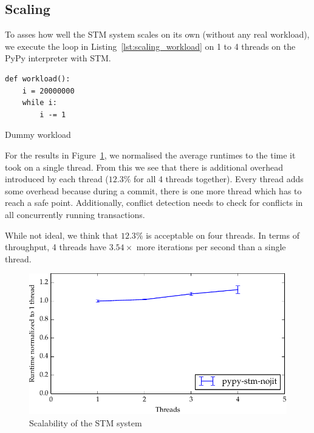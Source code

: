 \documentclass{sigplanconf}
\begin{document}

\subsection{Scaling}

To asses how well the STM system scales on its own (without any real
workload), we execute the loop in Listing~\ref{lst:scaling_workload}
on 1 to 4 threads on the PyPy interpreter with STM.

\begin{code}[h]
\begin{lstlisting}
def workload():
    i = 20000000
    while i:
        i -= 1
\end{lstlisting}
\caption{Dummy workload\label{lst:scaling_workload}}
\end{code}

For the results in Figure~\ref{fig:scaling}, we
normalised the average runtimes to the time it took on a single
thread. From this we see that there is additional overhead introduced
by each thread ($12.3\%$ for all 4 threads together). Every thread
adds some overhead because during a commit, there is one more thread
which has to reach a safe point. Additionally, conflict detection
needs to check for conflicts in all concurrently running transactions.

While not ideal, we think that $12.3\%$ is acceptable on four
threads. In terms of throughput, 4 threads have $3.54\times$
more iterations per second than a single thread.

\begin{figure}[h]
  \centering
  \includegraphics[width=1\columnwidth]{plots/scaling.pdf}
  \caption{Scalability of the STM system\label{fig:scaling}}
\end{figure}
\end{document}
